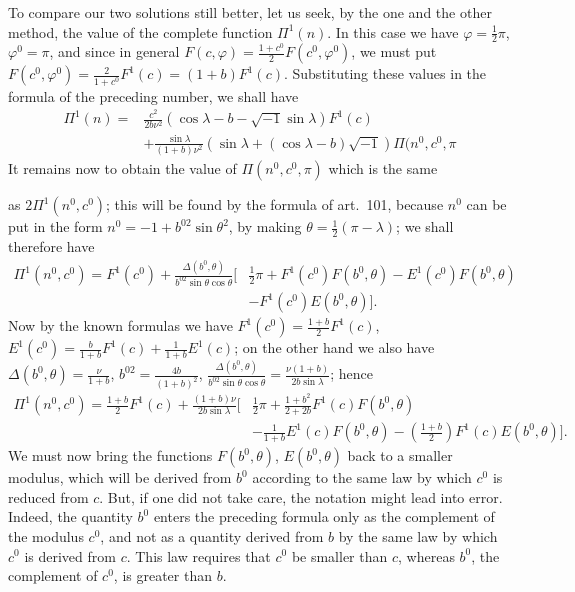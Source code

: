 \documentclass{article}
\begin{document}
To compare our two solutions still better, let us seek, by the one and the other method, the value of the complete function $\Pi^{1}(n)$. In this case we have $\varphi=\frac{1}{2}\pi$, $\varphi^{0}=\pi$, and since in general $F(c,\varphi)=\frac{1+c^{0}}{2}F(c^{0},\varphi^{0})$, we must put $F(c^{0},\varphi^{0})=\frac{2}{1+c^{0}}F^{1}(c)=(1+b)F^{1}(c)$. Substituting these values in the formula of the preceding number, we shall have
\[ \begin{aligned} \Pi^{1}(n)={}&\frac{c^{2}}{2b\nu^{2}}(\cos\lambda-b-\sqrt{-1}\sin\lambda)F^{1}(c)\\ &+\frac{\sin\lambda}{(1+b)\nu^{2}}(\sin\lambda+(\cos\lambda-b)\sqrt{-1})\Pi(n^{0},c^{0},\pi \end{aligned} \]
It remains now to obtain the value of $\Pi(n^{0},c^{0},\pi)$ which is the same

as $2\Pi^{1}(n^{0},c^{0})$; this will be found by the formula of art.\ 101, because $n^{0}$ can be put in the form $n^{0}=-1+b^{02}\sin\theta^{2}$, by making $\theta=\frac{1}{2}(\pi-\lambda)$; we shall therefore have
\[ \begin{aligned} \Pi^{1}(n^{0},c^{0})=F^{1}(c^{0})+\frac{\Delta(b^{0},\theta)}{b^{02}\sin\theta\cos\theta}\Big[&\tfrac{1}{2}\pi+F^{1}(c^{0})F(b^{0},\theta)-E^{1}(c^{0})F(b^{0},\theta)\\ &-F^{1}(c^{0})E(b^{0},\theta)\Big]. \end{aligned} \]
Now by the known formulas we have $F^{1}(c^{0})=\frac{1+b}{2}F^{1}(c)$, $E^{1}(c^{0})=\frac{b}{1+b}F^{1}(c)+\frac{1}{1+b}E^{1}(c)$; on the other hand we also have $\Delta(b^{0},\theta)=\frac{\nu}{1+b}$, $b^{02}=\frac{4b}{(1+b)^{2}}$, $\frac{\Delta(b^{0},\theta)}{b^{02}\sin\theta\cos\theta}=\frac{\nu(1+b)}{2b\sin\lambda}$; hence
\[ \begin{aligned} \Pi^{1}(n^{0},c^{0})=\frac{1+b}{2}F^{1}(c)+\frac{(1+b)\nu}{2b\sin\lambda}\Big[&\tfrac{1}{2}\pi+\frac{1+b^{2}}{2+2b}F^{1}(c)F(b^{0},\theta)\\ &-\frac{1}{1+b}E^{1}(c)F(b^{0},\theta)-\left(\frac{1+b}{2}\right)F^{1}(c)E(b^{0},\theta)\Big]. \end{aligned} \]
We must now bring the functions $F(b^{0},\theta)$, $E(b^{0},\theta)$ back to a smaller modulus, which will be derived from $b^{0}$ according to the same law by which $c^{0}$ is reduced from $c$. But, if one did not take care, the notation might lead into error. Indeed, the quantity $b^{0}$ enters the preceding formula only as the complement of the modulus $c^{0}$, and not as a quantity derived from $b$ by the same law by which $c^{0}$ is derived from $c$. This law requires that $c^{0}$ be smaller than $c$, whereas $b^{0}$, the complement of $c^{0}$, is greater than $b$.
\end{document}
